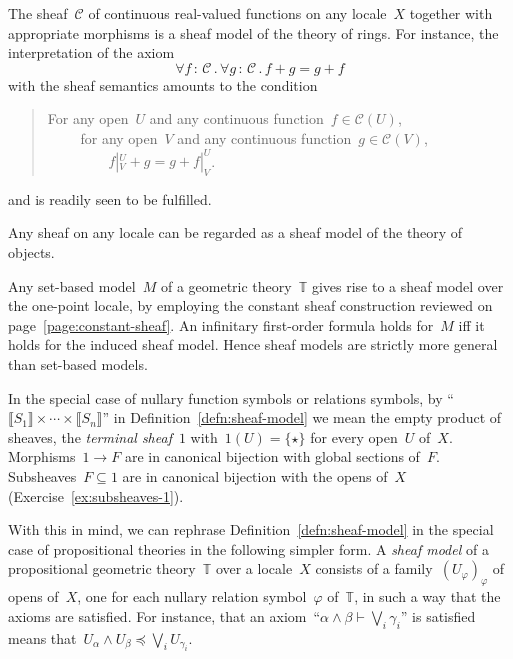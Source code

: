 \documentclass{ws-rv9x6}
\newcommand{\C}{\mathcal{C}}
\newcommand{\TT}{\mathbb{T}}
\renewcommand{\_}{\mathpunct{.}}
\newcommand{\?}{\,{:}\,}
\newcommand{\brak}[1]{{\llbracket{#1}\rrbracket}}
\begin{document}
\begin{example}The sheaf~$\C$ of continuous real-valued functions on any
locale~$X$ together with appropriate morphisms is a sheaf model of the theory
of rings. For instance, the interpretation of the axiom
\[ \forall f\?\C\_ \forall g\?\C\_ f + g = g + f \]
with the sheaf semantics amounts to the condition
\begin{quote}
For any open~$U$ and any continuous function~$f \in \C(U)$, \\
${\qquad}$ for any open~$V$ and any continuous function~$g \in \C(V)$, \\
${\qquad\qquad}$ $f|^U_V + g = g + f|^U_V$.
\end{quote}
and is readily seen to be fulfilled.
\end{example}

\begin{example}Any sheaf on any locale can be
regarded as a sheaf model of the theory of objects.\end{example}

\begin{example}\label{ex:sets-as-sheaf-models}
Any set-based model~$M$ of a geometric theory~$\TT$ gives rise to a
sheaf model over the one-point locale, by employing the constant sheaf
construction reviewed on page~\ref{page:constant-sheaf}. An infinitary
first-order formula holds for~$M$ iff it holds for the induced sheaf model.
Hence sheaf models are strictly more general than set-based models.
\end{example}

In the special case of nullary function symbols or relations symbols, by
``$\brak{S_1} \times \cdots \times \brak{S_n}$'' in
Definition~\ref{defn:sheaf-model} we mean the empty product of sheaves, the
\emph{terminal sheaf}~$1$ with~$1(U) = \{\star\}$ for every open~$U$ of~$X$.
Morphisms~$1 \to F$ are in canonical bijection with global sections of~$F$.
Subsheaves~$F \subseteq 1$ are in canonical bijection with the opens of~$X$
(Exercise~\ref{ex:subsheaves-1}).

With this in mind, we can rephrase Definition~\ref{defn:sheaf-model} in the
special case of propositional theories in the following simpler form. A
\emph{sheaf model} of a propositional geometric theory~$\TT$ over a locale~$X$
consists of a family~$(U_\varphi)_\varphi$ of opens of~$X$, one for each
nullary relation symbol~$\varphi$ of~$\TT$, in such a way that the axioms are
satisfied. For instance, that an axiom~``$\alpha \wedge \beta \vdash \bigvee_i
\gamma_i$'' is satisfied means that~$U_\alpha \wedge U_\beta \preceq \bigvee_i
U_{\gamma_i}$.
\end{document}
